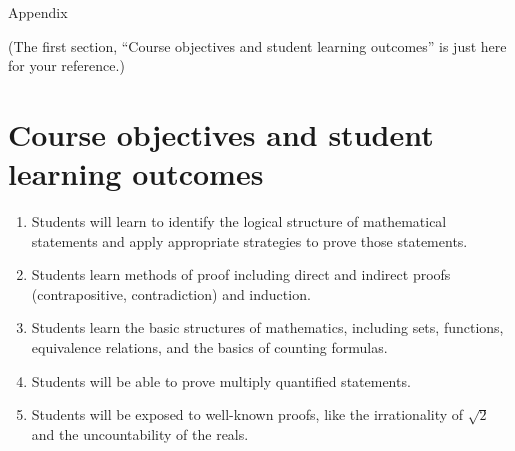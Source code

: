 \documentclass{article}
\theoremstyle{definition}
\begin{document}
\pagebreak
\appendix
\begin{center}
    \LARGE Appendix
\end{center}
\noindent (The first section, ``Course objectives and student learning outcomes'' is just here for your reference.)
\section{Course objectives and student learning outcomes}

\begin{enumerate}
    \item Students will learn to identify the logical structure of mathematical statements and apply appropriate strategies to prove those statements.
    \item Students learn methods of proof including direct and indirect proofs (contrapositive, contradiction) and induction.
    \item Students learn the basic structures of mathematics, including sets, functions, equivalence relations, and the basics of counting formulas.
    \item Students will be able to prove multiply quantified statements.
    \item Students will be exposed to well-known proofs, like the irrationality of $\sqrt{2}$ and the uncountability of the reals.
\end{enumerate}
\end{document}
